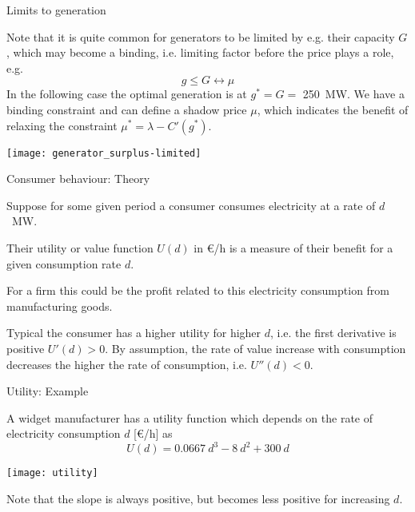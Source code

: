\documentclass[10pt,dvipsnames]{beamer}
\def\l{\lambda}
\def\m{\mu}
\begin{document}
\begin{frame}{Limits to generation}


  Note that it is quite common for generators to be limited by
  e.g. their capacity $G$, which may become a \alert{binding}, i.e. limiting factor before the price plays a role, e.g.
  \begin{equation*}
    g \leq G  \leftrightarrow \m
  \end{equation*}
  In the following case the optimal generation is at
  $g^* = G = $ 250~MW.   We have a \alert{binding} constraint and can define a \alert{shadow price} $\m$, which indicates the benefit of relaxing the constraint $\m^* = \l - C'(g^*)$.


  \centering
  \texttt{[image: generator\_surplus-limited]}

\end{frame}




\begin{frame}{Consumer behaviour: Theory}

  Suppose for some given period a consumer consumes electricity at a rate of
  $d$~MW.


  Their \alert{utility or value function} $U(d)$ in \euro/h is a
  measure of their benefit for a given consumption rate $d$.

  For a firm this could be the profit related to this electricity
  consumption from manufacturing goods.


  Typical the consumer has a higher utility for higher $d$, i.e. the
  first derivative is positive $U'(d) > 0$. By assumption, the rate of
  value increase with consumption decreases the higher the rate of
  consumption, i.e. $U''(d) < 0$.

\end{frame}


\begin{frame}{Utility: Example}


  A widget manufacturer has a utility function which depends on the
  rate of electricity consumption $d$ [\euro/h] as
  \begin{equation*}
    U(d) = 0.0667~d^3  - 8~d^2 + 300~d
  \end{equation*}


  \centering
  \texttt{[image: utility]}

  \raggedright
  Note that the slope is always positive, but becomes less positive
  for increasing $d$.
\end{frame}
\end{document}
